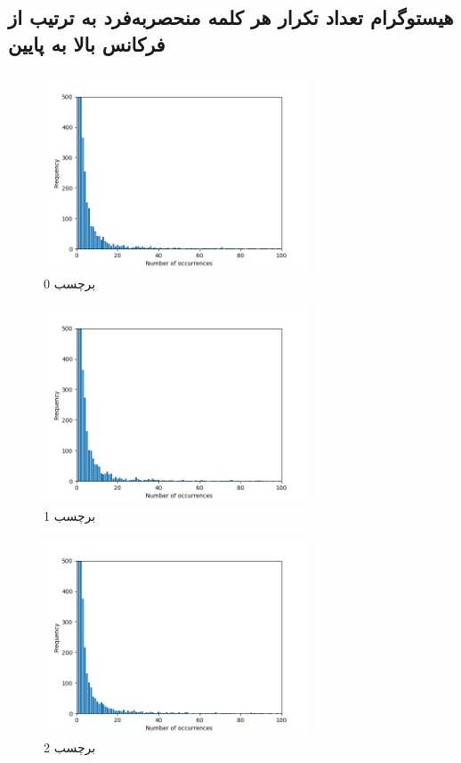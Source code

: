 \subsection{هیستوگرام تعداد تکرار هر کلمه منحصربه‌فرد به ترتیب از فرکانس بالا به پایین}
\begin{figure}[htbp]
  \centering
  \includegraphics[width=0.7\textwidth]{stats/histogram_0.png}
  \caption{برچسب 0}
  \label{fig:example}
\end{figure}

\begin{figure}[htbp]
  \centering
  \includegraphics[width=0.7\textwidth]{stats/histogram_1.png}
  \caption{برچسب 1}
  \label{fig:example}
\end{figure}

\begin{figure}[htbp]
  \centering
  \includegraphics[width=0.7\textwidth]{stats/histogram_2.png}
  \caption{برچسب 2}
  \label{fig:example}
\end{figure}